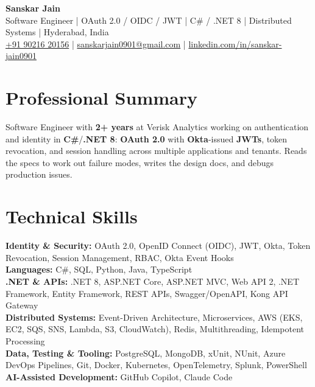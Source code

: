 \documentclass[a4paper,10pt]{article}
\begin{document}
\begin{center}
    {\LARGE \textbf{Sanskar Jain}} \\
    \vspace{2pt}
    Software Engineer \;|\; OAuth 2.0 / OIDC / JWT \;|\; C\# / .NET 8 \;|\; Distributed Systems \;|\; Hyderabad, India \\
    \vspace{2pt}
    \href{tel:+919021620156}{+91 90216 20156} \;|\;
    \href{mailto:sanskarjain0901@gmail.com}{sanskarjain0901@gmail.com} \;|\;
    \href{https://www.linkedin.com/in/sanskar-jain0901/}{linkedin.com/in/sanskar-jain0901}
\end{center}

\section*{Professional Summary}
Software Engineer with \textbf{2+ years} at Verisk Analytics working on authentication and identity in \textbf{C\#}/\textbf{.NET 8}: \textbf{OAuth 2.0} with \textbf{Okta}-issued \textbf{JWTs}, token revocation, and session handling across multiple applications and tenants. Reads the specs to work out failure modes, writes the design docs, and debugs production issues.

\section*{Technical Skills}
\begin{sloppypar}
\noindent
\textbf{Identity \& Security:} OAuth 2.0, OpenID Connect (OIDC), JWT, Okta, Token Revocation, Session Management, RBAC, Okta Event Hooks \\
\textbf{Languages:} C\#, SQL, Python, Java, TypeScript \\
\textbf{.NET \& APIs:} .NET 8, ASP.NET Core, ASP.NET MVC, Web API 2, .NET Framework, Entity Framework, REST APIs, Swagger/OpenAPI, Kong API Gateway \\
\textbf{Distributed Systems:} Event-Driven Architecture, Microservices, AWS (EKS, EC2, SQS, SNS, Lambda, S3, CloudWatch), Redis, Multithreading, Idempotent Processing \\
\textbf{Data, Testing \& Tooling:} PostgreSQL, MongoDB, xUnit, NUnit, Azure DevOps Pipelines, Git, Docker, Kubernetes, OpenTelemetry, Splunk, PowerShell \\
\textbf{AI-Assisted Development:} GitHub Copilot, Claude Code
\end{sloppypar}
\end{document}
